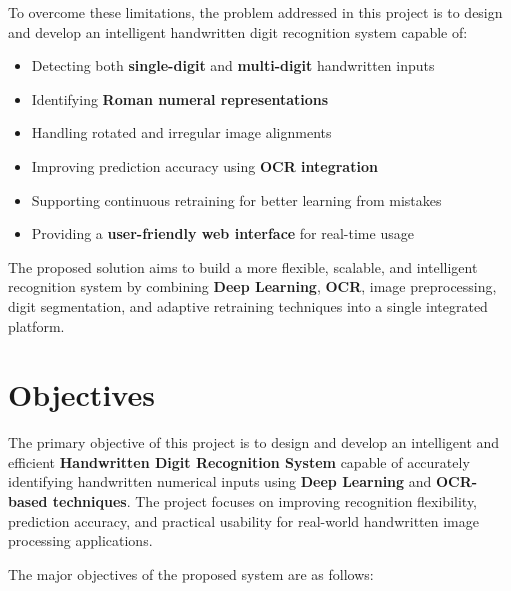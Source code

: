 \documentclass[12pt,a4paper]{article}
\begin{document}
\vspace{0.3cm}

\noindent
To overcome these limitations, the problem addressed in this project is to design and develop an intelligent handwritten digit recognition system capable of:
\begin{itemize}
\item Detecting both \textbf{single-digit} and \textbf{multi-digit} handwritten inputs
\item Identifying \textbf{Roman numeral representations}
\item Handling rotated and irregular image alignments
\item Improving prediction accuracy using \textbf{OCR integration}
\item Supporting continuous retraining for better learning from mistakes
\item Providing a \textbf{user-friendly web interface} for real-time usage
\end{itemize}

\vspace{0.3cm}

\noindent
The proposed solution aims to build a more flexible, scalable, and intelligent recognition system by combining \textbf{Deep Learning}, \textbf{OCR}, image preprocessing, digit segmentation, and adaptive retraining techniques into a single integrated platform.

\newpage

\section{Objectives}

\vspace{0.3cm}

\noindent
The primary objective of this project is to design and develop an intelligent and efficient \textbf{Handwritten Digit Recognition System} capable of accurately identifying handwritten numerical inputs using \textbf{Deep Learning} and \textbf{OCR-based techniques}. The project focuses on improving recognition flexibility, prediction accuracy, and practical usability for real-world handwritten image processing applications.

\vspace{0.3cm}

\noindent
The major objectives of the proposed system are as follows:
\end{document}
